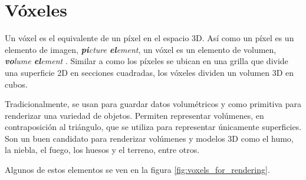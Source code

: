 \section{Vóxeles}\label{sec:voxels}

Un vóxel es el equivalente de un píxel en el espacio 3D.
Así como un píxel es un elemento de imagen, \textit{\textbf{pi}cture \textbf{el}ement}, un vóxel es un elemento de volumen, \textit{\textbf{vo}lume \textbf{el}ement} \cite{rtr}.
Similar a como los píxeles se ubican en una grilla que divide una superficie 2D en secciones cuadradas, los vóxeles dividen un volumen 3D en cubos.

Tradicionalmente, se usan para guardar datos volumétricos y como primitiva para renderizar una variedad de objetos.
Permiten representar volúmenes, en contraposición al triángulo, que se utiliza para representar únicamente superficies.
Son un buen candidato para renderizar volúmenes y modelos 3D como el humo, la niebla, el fuego, los huesos y el terreno, entre otros.

Algunos de estos elementos se ven en la figura \ref{fig:voxels_for_rendering}. %

